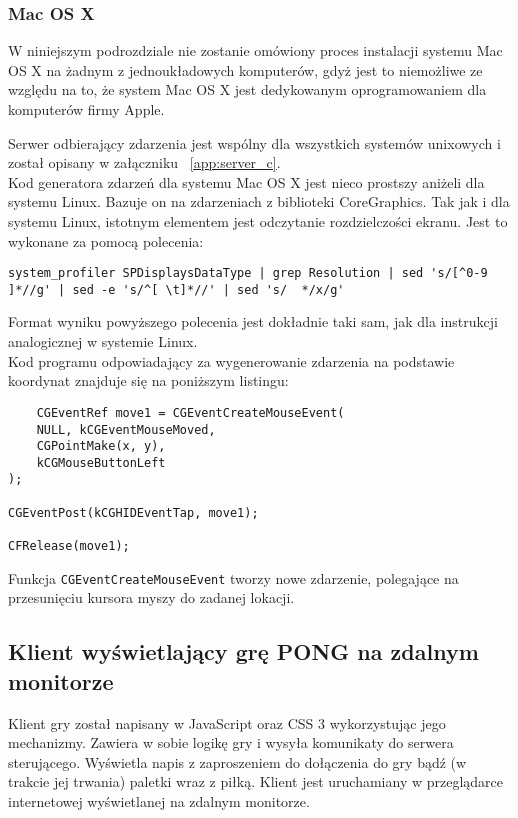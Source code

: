 \subsubsection{Mac OS X}

W niniejszym podrozdziale nie zostanie omówiony proces instalacji systemu Mac OS X na żadnym z jednoukładowych komputerów, gdyż jest to niemożliwe ze względu na to, że system Mac OS X jest dedykowanym oprogramowaniem dla komputerów firmy Apple. 

Serwer odbierający zdarzenia jest wspólny dla wszystkich systemów unixowych i został opisany w załączniku ~\ref{app:server_c}.
\\
Kod generatora zdarzeń dla systemu Mac OS X jest nieco prostszy aniżeli dla systemu Linux. Bazuje on na zdarzeniach z biblioteki CoreGraphics. Tak jak i dla systemu Linux, istotnym elementem jest odczytanie rozdzielczości ekranu. Jest to wykonane za pomocą polecenia:
\begin{lstlisting}
system_profiler SPDisplaysDataType | grep Resolution | sed 's/[^0-9 ]*//g' | sed -e 's/^[ \t]*//' | sed 's/  */x/g'
\end{lstlisting}
Format wyniku powyższego polecenia jest dokładnie taki sam, jak dla instrukcji analogicznej w systemie Linux.
\\
Kod programu odpowiadający za wygenerowanie zdarzenia na podstawie koordynat znajduje się na poniższym listingu:
\begin{lstlisting}
	CGEventRef move1 = CGEventCreateMouseEvent(
	NULL, kCGEventMouseMoved,
	CGPointMake(x, y),
	kCGMouseButtonLeft
);

CGEventPost(kCGHIDEventTap, move1);

CFRelease(move1);
\end{lstlisting}

Funkcja \lstinline{CGEventCreateMouseEvent} tworzy nowe zdarzenie, polegające na przesunięciu kursora myszy do zadanej lokacji.

\subsection{Klient wyświetlający grę PONG na zdalnym monitorze}
\label{sub:impl-displayclient-game}

Klient gry został napisany w JavaScript oraz CSS 3 wykorzystując jego mechanizmy. Zawiera w sobie logikę gry i wysyła komunikaty do serwera sterującego. Wyświetla napis z zaproszeniem do dołączenia do gry bądź (w trakcie jej trwania) paletki wraz z piłką. Klient jest uruchamiany w przeglądarce internetowej wyświetlanej na zdalnym monitorze.

